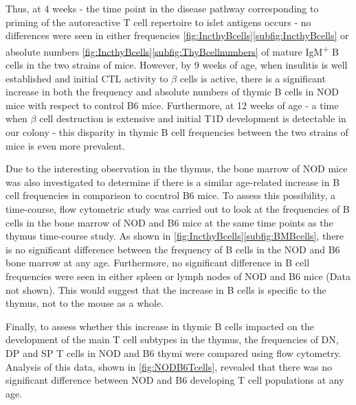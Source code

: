 Thus, at 4 weeks - the time point in the disease pathway corresponding to priming of the autoreactive T cell repertoire to islet antigens occurs - no differences were seen in either frequencies \cref{fig:IncthyBcells}\ref{subfig:IncthyBcells} or absolute numbers \cref{fig:IncthyBcells}\ref{subfig:ThyBcellnumbers} of mature IgM\textsuperscript{+} B cells in the two strains of mice. 
However, by 9 weeks of age, when insulitis is well established and initial CTL activity to $\beta$ cells is active, there is a significant increase in both the frequency and absolute numbers of thymic B cells in NOD mice with respect to control B6 mice. 
Furthermore, at 12 weeks of age - a time when $\beta$ cell destruction is extensive and initial T1D development is detectable in our colony - this disparity in thymic B cell frequencies between the two strains of mice is even more prevalent.


Due to the interesting observation in the thymus, the bone marrow of NOD mice was also investigated to determine if there is a similar age-related increase in B cell frequencies in comparison to cocntrol B6 mice.
To assess this possibility, a time-course, flow cytometric study was carried out to look at the frequencies of B cells in the bone marrow of NOD and B6 mice at the same time points as the thymus time-course study.
As shown in \cref{fig:IncthyBcells}\ref{subfig:BMBcells}, there is no significant difference between the frequency of B cells in the NOD and B6 bone marrow at any age.
Furthermore, no significant difference in B cell frequencies were seen in either spleen or lymph nodes of NOD and B6 mice (Data not shown).
This would suggest that the increase in B cells is specific to the thymus, not to the mouse as a whole.

Finally, to assess whether this increase in thymic B cells impacted on the development of the main T cell subtypes in the thymus, the frequencies of DN, DP and SP T cells in NOD and B6 thymi were compared using flow cytometry.
Analysis of this data, shown in \cref{fig:NODB6Tcells}, revealed that there was no significant difference between NOD and B6 developing T cell populations at any age.

